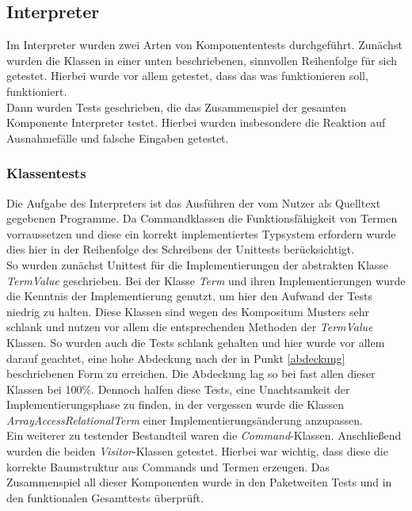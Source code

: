 \documentclass[parskip=full]{scrartcl}
\begin{document}
\subsection{Interpreter}
Im Interpreter wurden zwei Arten von Komponententests durchgeführt. Zunächst wurden die Klassen in einer unten beschriebenen, sinnvollen Reihenfolge für sich getestet. 
Hierbei wurde vor allem getestet, dass das was funktionieren soll, funktioniert.\\ %
Dann wurden Tests geschrieben, die das Zusammenspiel der gesamten Komponente Interpreter testet. Hierbei wurden insbesondere die Reaktion auf Ausnahmefälle und falsche Eingaben getestet.
\subsubsection{Klassentests}
Die Aufgabe des Interpreters ist das Ausführen der vom Nutzer als Quelltext gegebenen Programme. 
Da Commandklassen die Funktionsfähigkeit von Termen vorraussetzen und diese ein korrekt implementiertes Typsystem erfordern wurde dies hier in der Reihenfolge des Schreibens der Unittests berücksichtigt.  \\
So wurden zunächst Unittest für die Implementierungen der abstrakten Klasse \textit{TermValue} geschrieben.
Bei der Klasse \textit{Term} und ihren Implementierungen wurde die Kenntnis der Implementierung genutzt, um hier den Aufwand der Tests niedrig zu halten. Diese Klassen sind wegen des Kompositum Musters sehr schlank und nutzen vor allem die entsprechenden Methoden der \textit{TermValue} Klassen. So wurden auch die Tests schlank gehalten und hier wurde vor allem darauf geachtet, eine hohe Abdeckung nach der in Punkt \ref{abdeckung} beschriebenen Form zu erreichen.
Die Abdeckung lag so bei fast allen dieser Klassen bei 100\%. Dennoch halfen diese Tests, eine Unachtsamkeit der Implementierungsphase zu finden, in der vergessen wurde die Klassen \textit{ArrayAccessRelationalTerm} einer Implementierungsänderung anzupassen.\\
Ein weiterer zu testender Bestandteil waren die \textit{Command}-Klassen. 
Anschließend wurden die beiden \textit{Visitor}-Klassen getestet. Hierbei war wichtig, dass diese die korrekte Baumstruktur aus Commands und Termen erzeugen.
Das Zusammenspiel all dieser Komponenten wurde in den Paketweiten Tests und in den funktionalen Gesamttests überprüft.
\end{document}

